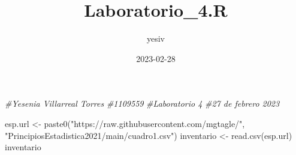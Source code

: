 \documentclass[
]{article}
\title{Laboratorio\_4.R}
\author{yesiv}
\date{2023-02-28}
\newenvironment{Shaded}{\begin{snugshade}}{\end{snugshade}}
\newcommand{\CommentTok}[1]{\textcolor[rgb]{0.56,0.35,0.01}{\textit{#1}}}
\newcommand{\FunctionTok}[1]{\textcolor[rgb]{0.00,0.00,0.00}{#1}}
\newcommand{\NormalTok}[1]{#1}
\newcommand{\OtherTok}[1]{\textcolor[rgb]{0.56,0.35,0.01}{#1}}
\newcommand{\StringTok}[1]{\textcolor[rgb]{0.31,0.60,0.02}{#1}}
\begin{document}
\maketitle

\begin{Shaded}
\begin{Highlighting}[]
\CommentTok{\#Yesenia Villarreal Torres}
\CommentTok{\#1109559}
\CommentTok{\#Laboratorio 4}
\CommentTok{\#27 de febrero 2023}

\NormalTok{esp.url }\OtherTok{\textless{}{-}} \FunctionTok{paste0}\NormalTok{(}\StringTok{"https://raw.githubusercontent.com/mgtagle/"}\NormalTok{,}
                  \StringTok{"PrincipiosEstadistica2021/main/cuadro1.csv"}\NormalTok{)}
\NormalTok{inventario }\OtherTok{\textless{}{-}} \FunctionTok{read.csv}\NormalTok{(esp.url)}
\NormalTok{inventario}
\end{Highlighting}
\end{Shaded}
\end{document}
